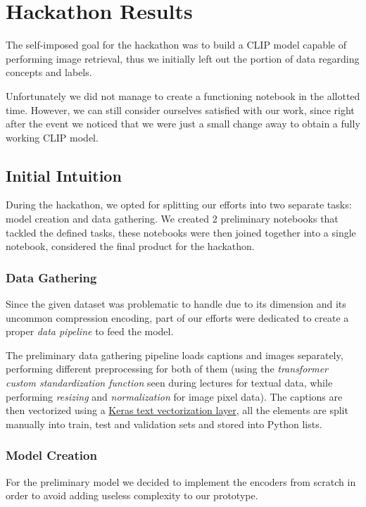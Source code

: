 \documentclass[10pt,twocolumn,letterpaper]{article}
\begin{document}
\section{Hackathon Results}
The self-imposed goal for the hackathon was to build a CLIP model capable of performing image retrieval, thus we initially left out the portion of data regarding concepts and labels.

Unfortunately we did not manage to create a functioning notebook in the allotted time.
However, we can still consider ourselves satisfied with our work, since right after the event we noticed that we were just a small change away to obtain a fully working CLIP model.

\subsection{Initial Intuition}
During the hackathon, we opted for splitting our efforts into two separate tasks: model creation and data gathering.
We created 2 preliminary notebooks that tackled the defined tasks, these notebooks were then joined together into a single notebook, considered the final product for the hackathon.

\subsubsection{Data Gathering}
Since the given dataset was problematic to handle due to its dimension and its uncommon compression encoding, part of our efforts were dedicated to create a proper \textit{data pipeline} to feed the model.

The preliminary data gathering pipeline loads captions and images separately, performing different preprocessing for both of them (using the \textit{transformer custom standardization function} seen during lectures for textual data, while performing \textit{resizing} and \textit{normalization} for image pixel data).
The captions are then vectorized using a \href{https://www.tensorflow.org/api_docs/python/tf/keras/layers/TextVectorization}{Keras text vectorization layer}, all the elements are split manually into train, test and validation sets and stored into Python lists.


\subsubsection{Model Creation}
For the preliminary model we decided to implement the encoders from scratch in order to avoid adding useless complexity to our prototype.
\end{document}
